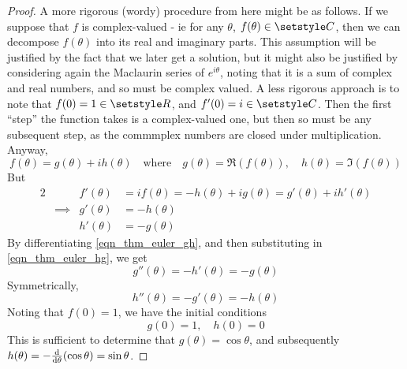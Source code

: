 \begin{proof}
 A more rigorous (wordy) procedure from here might be as follows. If we suppose
 that \(f\) is complex-valued - ie for any \(\theta\),
 \(f(\theta) \in \Complex\), then we can decompose \(f(\theta)\) into its real
 and imaginary parts. This assumption will be justified by the fact that we
 later get a solution, but it might also be justified by considering again the
 Maclaurin series of \(e^{i\theta}\), noting that it is a sum of complex and
 real numbers, and so must be complex valued. A less rigorous approach is to
 note that \(f(0) = 1 \in \Reals\), and \(f'(0) = i \in \Complex\). Then the
 first ``step'' the function takes is a complex-valued one, but then so must be
 any subsequent step, as the commmplex numbers are closed under multiplication.
  Anyway,
 \begin{equation*}
  f(\theta) = g(\theta) + i h(\theta)
   \quad \text{where} \quad
    g(\theta) = \Re(f(\theta)),\quad h(\theta) = \Im(f(\theta))
 \end{equation*}
 But
 \begin{alignat*}2
  && f'(\theta) &= if(\theta) = -h(\theta) + ig(\theta)
                 = g'(\theta) + ih'(\theta) \\
  &\implies{}&
      g'(\theta) &= -h(\theta) \tag{\(\ast\)} \label{eqn_thm_euler_gh} \\
  &&  h'(\theta) &= -g(\theta) \tag{\(\ast\ast\)} \label{eqn_thm_euler_hg}
 \end{alignat*}
    By differentiating \ref{eqn_thm_euler_gh}, and then substituting in
    \ref{eqn_thm_euler_hg}, we get
    \begin{equation*}
     g''(\theta) = -h'(\theta) = -g(\theta)
    \end{equation*}
    Symmetrically,
    \begin{equation*}
     h''(\theta) = -g'(\theta) = -h(\theta)
    \end{equation*}
    Noting that \(f(0) = 1\), we have the initial conditions
    \begin{equation*}
     g(0) = 1, \quad h(0) = 0
    \end{equation*}
    This is sufficient to determine that \(g(\theta) = \cos \theta\), and
    subsequently \(h(\theta) = -\dv{\theta}(\cos \theta) = \sin \theta\).
\end{proof}
